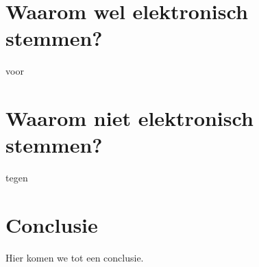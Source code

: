 \documentclass[a4paper]{article}
\begin{document}
\section{Waarom wel elektronisch stemmen?}

voor

\section{Waarom niet elektronisch stemmen?}

tegen


\section{Conclusie}

Hier komen we tot een conclusie.

\newpage


\renewcommand\refname{Literatuur}

\end{document}

